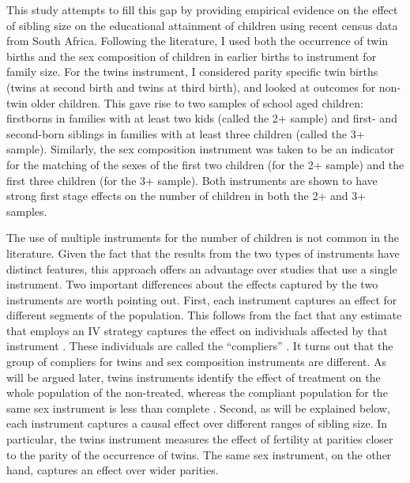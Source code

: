 This study attempts to fill this gap by providing empirical evidence on the effect of sibling size on the educational attainment of children using recent census data from South Africa. Following the literature, I used both the occurrence of twin births and the sex composition of children in earlier births to instrument for family size. For the twins instrument, I considered parity specific twin births (twins at second birth and twins at third birth), and looked at outcomes for non-twin older children. This gave rise to two samples of school aged children: firstborns in families with at least two kids (called the 2+ sample) and first- and second-born siblings in families with at least three children (called the 3+ sample). Similarly, the sex composition instrument was taken to be an indicator for the matching of the sexes of the first two children (for the 2+ sample) and the first three children (for the 3+ sample). Both instruments are shown to have strong first stage effects on the number of children in both the 2+ and 3+ samples.

The use of multiple instruments for the number of children is not common in the literature. Given the fact that the results from the two types of instruments have distinct features, this approach offers an advantage over studies that use a single instrument. Two important differences about the effects captured by the two instruments are worth pointing out. First, each instrument captures an effect for different segments of the population. This follows from the fact that any estimate that employs an IV strategy captures the effect on individuals affected by that instrument \parencite{imbens_identification_1994}. These individuals are called the \enquote{compliers} \parencite{angrist_identification_1996}. It turns out that the group of compliers for twins and sex composition instruments are different. As will be argued later, twins instruments identify the effect of treatment on the whole population of the non-treated, whereas the compliant population for the same sex instrument is less than complete \parencite{Angrist2006,Angrist2009}. Second, as will be explained below, each instrument captures a causal effect over different ranges of sibling size. In particular, the twins instrument measures the effect of fertility at parities closer to the parity of the occurrence of twins. The same sex instrument, on the other hand, captures an effect over wider parities. 

